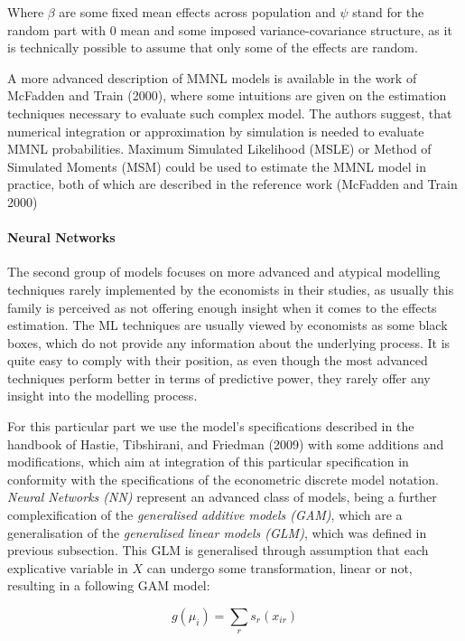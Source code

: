 \documentclass[12pt,]{article}
\let\oldparagraph\paragraph
\renewcommand{\paragraph}[1]{\oldparagraph{#1}\mbox{}}
\begin{document}
Where \(\beta\) are some fixed mean effects across population and
\(\psi\) stand for the random part with \(0\) mean and some imposed
variance-covariance structure, as it is technically possible to assume
that only some of the effects are random.

A more advanced description of MMNL models is available in the work of
McFadden and Train (2000), where some intuitions are given on the
estimation techniques necessary to evaluate such complex model. The
authors suggest, that numerical integration or approximation by
simulation is needed to evaluate MMNL probabilities. Maximum Simulated
Likelihood (MSLE) or Method of Simulated Moments (MSM) could be used to
estimate the MMNL model in practice, both of which are described in the
reference work (McFadden and Train 2000)

\hypertarget{neural-networks}{%
\paragraph{Neural Networks}\label{neural-networks}}

The second group of models focuses on more advanced and atypical
modelling techniques rarely implemented by the economists in their
studies, as usually this family is perceived as not offering enough
insight when it comes to the effects estimation. The ML techniques are
usually viewed by economists as some black boxes, which do not provide
any information about the underlying process. It is quite easy to comply
with their position, as even though the most advanced techniques perform
better in terms of predictive power, they rarely offer any insight into
the modelling process.

For this particular part we use the model's specifications described in
the handbook of Hastie, Tibshirani, and Friedman (2009) with some
additions and modifications, which aim at integration of this particular
specification in conformity with the specifications of the econometric
discrete model notation. \emph{Neural Networks (NN)} represent an
advanced class of models, being a further complexification of the
\emph{generalised additive models (GAM)}, which are a generalisation of
the \emph{generalised linear models (GLM)}, which was defined in
previous subsection. This GLM is generalised through assumption that
each explicative variable in \(X\) can undergo some transformation,
linear or not, resulting in a following GAM model:

\begin{equation}
g(\mu_i) = \sum_r s_r(x_{ir})
\end{equation}
\end{document}
